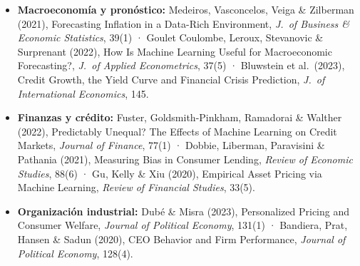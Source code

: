 \documentclass[12pt,a4paper]{article}
\begin{document}
\begin{itemize}
    \item \textbf{Macroeconomía y pronóstico:} Medeiros, Vasconcelos, Veiga \& Zilberman (2021), Forecasting Inflation in a Data-Rich Environment, \textit{J.\ of Business \& Economic Statistics}, 39(1) · Goulet Coulombe, Leroux, Stevanovic \& Surprenant (2022), How Is Machine Learning Useful for Macroeconomic Forecasting?, \textit{J.\ of Applied Econometrics}, 37(5) · Bluwstein et al.\ (2023), Credit Growth, the Yield Curve and Financial Crisis Prediction, \textit{J.\ of International Economics}, 145.
    \item \textbf{Finanzas y crédito:} Fuster, Goldsmith-Pinkham, Ramadorai \& Walther (2022), Predictably Unequal? The Effects of Machine Learning on Credit Markets, \textit{Journal of Finance}, 77(1) · Dobbie, Liberman, Paravisini \& Pathania (2021), Measuring Bias in Consumer Lending, \textit{Review of Economic Studies}, 88(6) · Gu, Kelly \& Xiu (2020), Empirical Asset Pricing via Machine Learning, \textit{Review of Financial Studies}, 33(5).
    \item \textbf{Organización industrial:} Dubé \& Misra (2023), Personalized Pricing and Consumer Welfare, \textit{Journal of Political Economy}, 131(1) · Bandiera, Prat, Hansen \& Sadun (2020), CEO Behavior and Firm Performance, \textit{Journal of Political Economy}, 128(4).
\end{itemize}
\end{document}

